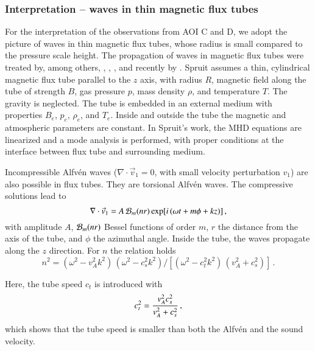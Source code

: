 

\subsubsection*{Interpretation -- waves in thin magnetic flux tubes\label{tubewaves}}

For the interpretation of the observations from AOI C and D, we adopt the picture of waves in thin magnetic flux tubes, whose radius is small compared to the pressure scale height. The propagation of waves in magnetic flux tubes were treated by, among others, \citet{defouw76}, \citet{wentzel79}, \citet{1982SoPh...75....3S}, and recently by \citet{mousielak07}. Spruit assumes a thin, cylindrical magnetic flux tube parallel to the $z$ axis, with radius $R$, magnetic field along the tube of strength $B$, gas pressure $p$, mass density $\rho$, and temperature $T$. The gravity is neglected. The tube is embedded in an external medium with properties $B_e$, $p_e$, $\rho_e$, and $T_e$. Inside and outside the tube the magnetic and atmospheric parameters are constant. In Spruit's \citeyearpar{1982SoPh...75....3S} work, the MHD equations are linearized and a mode analysis is performed, with proper conditions at the {interface} between flux tube and surrounding medium.

Incompressible Alfv\'en waves ($\nabla\cdot\vec v_1=0$, with small velocity perturbation $v_1$) are also possible in flux tubes. They are torsional Alfv\'en waves. The compressive solutions lead to 
\begin{equation}
\nabla\cdot\vec v_1=A\,{\cal B}_m(nr)\exp[i\,(\omega t+m\phi+kz)]\,,
\label{mhd28}
\end{equation}
with amplitude $A$, ${\cal B}_m(nr)$ Bessel functions of order $m$, $r$ the distance from the axis of the tube, and $\phi$ the azimuthal angle. Inside the tube, the waves propagate along the $z$ direction. For $n$ the relation holds
\begin{equation}  
n^2 = (\omega^2-v_A^2k^2)\,(\omega^2-c_s^2k^2)/[(\omega^2-c_t^2k^2)\,(v_A^2+c_s^2)]\,.
\label{mhd29}
\end{equation}
\begin{comment}
Here, the sound velocity and the Alfv\'en velocity are given by
\begin{equation}
c_s^2=\gamma\frac{p}{\rho}~~~\mathrm{and}~~~v_A^2=\frac{B^2}{4\pi\rho}\,,
\label{mhd30}
\end{equation}
respectively, with magnetic field strength $B$ in Gauss, mass density $\rho$ in g\,cm$^{-3}$, and gas pressure $p$ in dyn\,cm$^{-2}$. $B$, $\rho$ and $p$ are the unperturbed quantities. In Eq.~\ref{mhd29}, 
\end{comment}
Here, the tube speed $c_t$ is introduced with
\begin{equation}
c_t^2={v_A^2c_s^2\over v_A^2+c_s^2}\,,
\label{mhd31}
\end{equation}
 which shows that the tube speed is smaller than both the Alfv\'en and the sound velocity.

